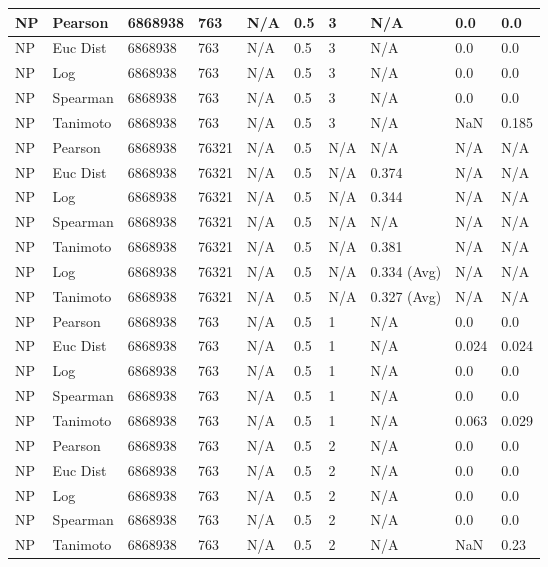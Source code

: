 \documentclass{article}
\begin{document}
\begin{longtable}{ |p{1.7cm}|p{1.9cm}|p{1.5cm}|p{1.5cm}|p{0.75cm}|p{0.75cm}|p{0.75cm}|p{0.75cm}|p{1.5cm}|p{1.5cm}|}
    NP & Pearson & 6868938 & 763 & N/A &  0.5  & 3 & N/A & 0.0 & 0.0  \\ \hline
    NP & Euc Dist & 6868938 & 763 & N/A &  0.5  & 3  & N/A &0.0 & 0.0   \\ \hline
    NP & Log & 6868938 & 763 & N/A &  0.5  & 3  & N/A & 0.0 & 0.0  \\ \hline
    NP & Spearman & 6868938 & 763 & N/A &  0.5  & 3  & N/A &0.0 & 0.0 \\ \hline
    NP & Tanimoto & 6868938 & 763 & N/A &  0.5  & 3 & N/A & NaN & 0.185 \\ \hline
    
    NP & Pearson & 6868938 & 76321 & N/A &  0.5 & N/A & N/A & N/A & N/A  \\ \hline
    NP & Euc Dist & 6868938 & 76321 & N/A &  0.5 & N/A & 0.374 & N/A & N/A   \\ \hline
    NP & Log & 6868938 & 76321 & N/A &  0.5 & N/A & 0.344 & N/A & N/A  \\ \hline
    NP & Spearman & 6868938 & 76321 & N/A &  0.5 & N/A & N/A & N/A & N/A \\ \hline
    NP & Tanimoto & 6868938 & 76321 & N/A &  0.5 & N/A & 0.381 & N/A & N/A \\ \hline
    NP & Log & 6868938 & 76321 & N/A &  0.5 & N/A & 0.334 (Avg) & N/A & N/A \\ \hline
    NP & Tanimoto & 6868938 & 76321 & N/A &  0.5 & N/A & 0.327 (Avg) & N/A & N/A \\ \hline
    
    NP & Pearson & 6868938 & 763 & N/A &  0.5  & 1 & N/A & 0.0 & 0.0  \\ \hline
    NP & Euc Dist & 6868938 & 763 & N/A &  0.5  & 1 & N/A &0.024 & 0.024   \\ \hline
    NP & Log & 6868938 & 763 & N/A &  0.5  & 1 & N/A & 0.0 & 0.0  \\ \hline
    NP & Spearman & 6868938 & 763 & N/A &  0.5  & 1 & N/A &0.0 & 0.0 \\ \hline
    NP & Tanimoto & 6868938 & 763 & N/A &  0.5  & 1 & N/A & 0.063 & 0.029 \\ \hline
    
    NP & Pearson & 6868938 & 763 & N/A &  0.5  & 2 & N/A & 0.0 & 0.0  \\ \hline
    NP & Euc Dist & 6868938 & 763 & N/A &  0.5  &  2 & N/A &0.0 & 0.0   \\ \hline
    NP & Log & 6868938 & 763 & N/A &  0.5  &  2 & N/A & 0.0 & 0.0 \\ \hline
    NP & Spearman & 6868938 & 763 & N/A &  0.5  &  2 & N/A & 0.0 & 0.0 \\ \hline
    NP & Tanimoto & 6868938 & 763 & N/A &  0.5  &  2 & N/A & NaN & 0.23 \\ \hline
    

\end{longtable}
\end{document}
